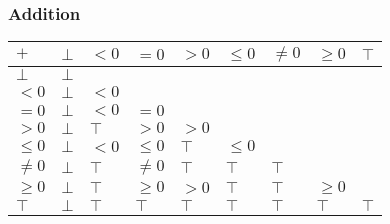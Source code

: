 \documentclass{beamer}
\begin{document}
\begin{frame}
    \frametitle{Addition}
\begin{table}[]
    \begin{tabular}{|l|l|l|l|l|l|l|l|l|}
    \hline
    $+$     & $\bot$ & $<0$   & $=0$    & $>0$   & $\le 0$ & $\ne 0$ & $\ge 0$ & $\top$ \\ \hline
    $\bot$  & $\bot$ &        &         &        &         &         &         &        \\ \hline
    $<0$    & $\bot$ & $<0$   &         &        &         &         &         &        \\ \hline
    $=0$    & $\bot$ & $<0$   & $=0$    &        &         &         &         &        \\ \hline
    $>0$    & $\bot$ & $\top$ & $>0$    & $>0$   &         &         &         &        \\ \hline
    $\le 0$ & $\bot$ & $<0$   & $\le 0$ & $\top$ & $\le 0$ &         &         &        \\ \hline
    $\ne 0$ & $\bot$ & $\top$ & $\ne 0$ & $\top$ & $\top$  & $\top$  &         &        \\ \hline
    $\ge 0$ & $\bot$ & $\top$ & $\ge 0$ & $>0$   & $\top$  & $\top$  & $\ge 0$ &        \\ \hline
    $\top$  & $\bot$ & $\top$ & $\top$  & $\top$ & $\top$  & $\top$  & $\top$  & $\top$ \\ \hline
    \end{tabular}
    \end{table}
\end{frame}
    
\end{document}
